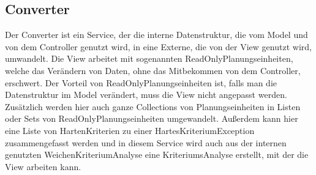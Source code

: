 \subsection{Converter}\label{subsec:converter}
Der Converter ist ein Service, der die interne Datenstruktur, die vom Model und von dem Controller genutzt wird,
in eine Externe, die von der View genutzt wird, umwandelt.
Die View arbeitet mit sogenannten ReadOnlyPlanungseinheiten, welche das Verändern von Daten,
ohne das Mitbekommen von dem Controller, erschwert.
Der Vorteil von ReadOnlyPlanungseinheiten ist, falls man die Datenstruktur im Model verändert,
muss die View nicht angepasst werden.
Zusätzlich werden hier auch ganze Collections von Planungseinheiten in Listen oder Sets von ReadOnlyPlanungseinheiten umgewandelt.
Außerdem kann hier eine Liste von HartenKriterien zu einer HartesKriteriumException zusammengefasst werden und
in diesem Service wird auch aus der internen genutzten WeichenKriteriumAnalyse eine KriteriumsAnalyse erstellt, mit der die View arbeiten kann.